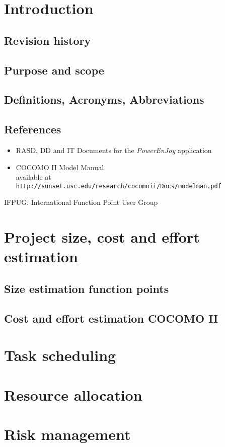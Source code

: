\section{Introduction}
\subsection{Revision history}
\subsection{Purpose and scope}
\subsection{Definitions, Acronyms, Abbreviations}
\subsection{References}
\begin{itemize}
	\item RASD, DD and IT Documents for the \textit{PowerEnJoy} application
	\item COCOMO II Model Manual\\
	available at \texttt{http://sunset.usc.edu/research/cocomoii/Docs/modelman.pdf}
\end{itemize}
IFPUG: International Function Point User Group

\clearpage
\section{Project size, cost and effort estimation}
\subsection{Size estimation function points}


\subsection{Cost and effort estimation COCOMO II}


\clearpage
\section{Task scheduling}

\clearpage
\section{Resource allocation}

\clearpage
\section{Risk management}